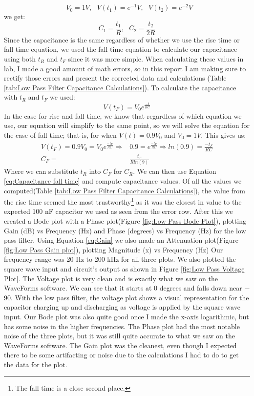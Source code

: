 \documentclass{article}
\begin{document}
\begin{equation}
    \text{ } V_0 = 1 V, \text{ } V(t_1) = e^{-1} V, \text{ } V(t_2) = e^{-2} V
\end{equation}
we get:
\begin{equation}
    C_1 = \frac{t_1}{R}, \text{ } C_2 = \frac{t_2}{2R}\label{eq:Capacitance Calculations}
\end{equation}
Since the capacitance is the same regardless of whether we use the rise time or fall time equation, we used the fall time equation to calculate our capacitance using both $t_R$ and $t_F$ since it was more simple. When calculating these values in lab, I made a good amount of math errors, so in this report I am making sure to rectify those errors and present the corrected data and calculations (Table \ref{tab:Low Pass Filter Capacitance Calculations}). To calculate the capacitance with $t_R$ and $t_F$ we used:
\begin{equation}
    V(t_F) = V_0e^{\frac{-t}{RC}} 
\end{equation}
In the case for rise and fall time, we know that regardless of which equation we use, our equation will simplify to the same point, so we will solve the equation for the case of fall time; that is, for when $V(t) = 0.9V_0$ and $V_0 = 1 V$. This gives us:
\begin{align}
    V(t_F) = 0.9V_0 = V_0e^{\frac{-t_F}{RC}} \Rightarrow& 0.9 = e^{\frac{-t_F}{RC}} \Rightarrow ln(0.9) = \frac{-t_F}{RC}\label{eq:Voltage fall time}\\
    C_F =& \frac{t_F}{Rln(9)}\label{eq:Capacitance fall time}
\end{align}
Where we can substitute $t_R$ into $C_F$ for  $C_R$. We can then use Equation \ref{eq:Capacitance fall time} and compute capacitance values. Of all the values we computed(Table \ref{tab:Low Pass Filter Capacitance Calculations}), the value from the rise time seemed the most trustworthy\footnote{The fall time is a close second place.} as it was the closest in value to the expected 100 nF capacitor we used as seen from the error row. After this we created a Bode plot with a Phase plot(Figure \ref{fig:Low Pass Bode Plot}), plotting Gain (dB) vs Frequency (Hz) and Phase (degrees) vs Frequency (Hz) for the low pass filter. Using Equation \ref{eq:Gain} we also made an Attenuation plot(Figure \ref{fig:Low Pass Gain plot}), plotting Magnitude (x) vs Frequency (Hz) Our frequency range was 20 Hz to 200 kHz for all three plots. We also plotted the square wave input and circuit's output as shown in Figure \ref{fig:Low Pass Voltage Plot}. The Voltage plot is very clean and is exactly what we saw on the WaveForms software. We can see that it starts at 0 degrees and falls down near $-$90. With the low pass filter, the voltage plot shows a visual representation for the capacitor charging up and discharging as voltage is applied by the square wave input. Our Bode plot was also quite good once I made the x-axis logarithmic, but has some noise in the higher frequencies. The Phase plot had the most notable noise of the three plots, but it was still quite accurate to what we saw on the WaveForms software. The Gain plot was the cleanest, even though I expected there to be some artifacting or noise due to the calculations I had to do to get the data for the plot.
\end{document}
